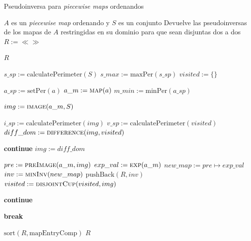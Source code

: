 \begin{algorithm}
\caption{Pseudoinversa para \textit{piecewise maps} ordenandos}
\label{alg:firstInv-ord}
\begin{algorithmic}[1]
\Require $A$ es un \textit{piecewise map} ordenando y $S$ es un conjunto
\Ensure Devuelve las pseudoinversas de los mapas de $A$ restringidas en su dominio para que sean disjuntas dos a dos
    \State $R := \ll\gg$                 
    
        \State \Return $R$
    \EndIf

    \State $s\_sp := \mathrm{calculatePerimeter}(S)$
    \State $s\_max := \mathrm{maxPer}(s\_sp)$
    \State $visited := \{\}$
    
        \State $a\_sp := \mathrm{setPer}(a)$ 
        \State $a\_m := \Call{map}{a}$
        \State $m\_min := \mathrm{minPer}(a\_sp)$
        
            \State $img := \Call{image}{a\_m, S}$
    
                
                
                    \State $i\_sp := \mathrm{calculatePerimeter}(img)$
                    \State $v\_sp := \mathrm{calculatePerimeter}(visited)$
                        \State $diff\_dom := \Call{difference}{img, visited}$
    
                            \State \textbf{continue}
                        \Else
                            \State $img := diff\_dom$
                        \EndIf
                    \Else
                    \EndIf
                \Else
                \EndIf

                \State $pre := \Call{preImage}{a\_m, img}$
                \State $exp\_val := \Call{exp}{a\_m}$
                \State $new\_map := pre \mapsto exp\_val$
                \State $inv := \Call{minInv}{new\_map}$
                \State $\mathrm{pushBack}(R,inv)$ 
                \State $visited := \Call{disjointCup}{visited, img}$
            \EndIf
            
            \State \textbf{continue} 
        \EndIf

        

            \State \textbf{break}    
        \EndIf
    \EndFor

    \State $ \mathrm{sort}(R,\mathrm{mapEntryComp})$
    \State \Return $R$
\EndFunction
\end{algorithmic}
\end{algorithm}


